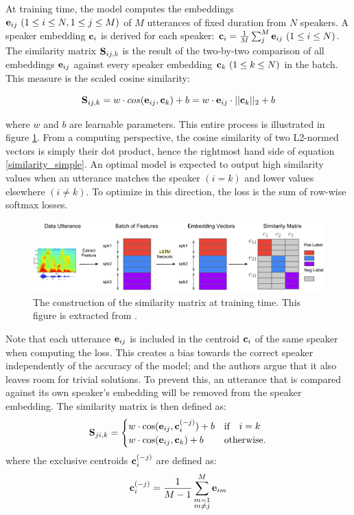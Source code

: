 \documentclass[a4paper, oneside, 12pt, english]{article}
\begin{document}
At training time, the model computes the embeddings $\mathbf{e}_{ij}\ (1 \leq i \leq N, 1 \leq j \leq M)$ of $M$ utterances of fixed duration from $N$ speakers. A speaker embedding $\mathbf{c}_i$ is derived for each speaker: $\mathbf{c}_i=\frac{1}{M}\sum_{j}^{M}\mathbf{e}_{ij}\ (1 \leq i \leq N)$. The similarity matrix $\mathbf{S}_{ij,k}$ is the result of the two-by-two comparison of all embeddings $\mathbf{e}_{ij}$ against every speaker embedding $\mathbf{c}_{k}\ (1 \leq k \leq N)$ in the batch. This measure is the scaled cosine similarity:

\begin{equation} \label{similarity_simple}
	\mathbf{S}_{ij,k} = w \cdot cos(\mathbf{e}_{ij}, \mathbf{c}_{k}) + b = w \cdot \mathbf{e}_{ij} \cdot ||\mathbf{c}_{k}||_2 + b
\end{equation}

where $w$ and $b$ are learnable parameters. This entire process is illustrated in figure \ref{sim_matrix}.  From a computing perspective, the cosine similarity of two L2-normed vectors is simply their dot product, hence the rightmost hand side of equation \ref{similarity_simple}. An optimal model is expected to output high similarity values when an utterance matches the speaker $(i = k)$ and lower values elsewhere $(i \neq k)$. To optimize in this direction, the loss is the sum of row-wise softmax losses.

\begin{figure}[h]
	\centering
	\includegraphics[width=\linewidth]{images/sim_matrix.png}
	\caption{The construction of the similarity matrix at training time. This figure is extracted from \citep{GE2E}.}
	\label{sim_matrix}
\end{figure}

Note that each utterance $\mathbf{e}_{ij}$ is included in the centroid $\mathbf{c}_{i}$ of the same speaker when computing the loss. This creates a bias towards the correct speaker independently of the accuracy of the model; and the authors argue that it also leaves room for trivial solutions. To prevent this, an utterance that is compared against its own speaker's embedding will be removed from the speaker embedding. The similarity matrix is then defined as:
\begin{equation} \label{similarity_exclusive}
\mathbf{S}_{ji,k} =
\begin{cases}
w\cdot \cos(\mathbf{e}_{ij}, \mathbf{c}_i^{(-j)})+b & \text{if} \quad i=k \\
w\cdot \cos(\mathbf{e}_{ij}, \mathbf{c}_k)+b & \text{otherwise}.
\end{cases}
\end{equation}
where the exclusive centroids $\mathbf{c}_{i}^{(-j)}$ are defined as:
\begin{equation} \label{exclusive_centroid}
\mathbf{c}_{i}^{(-j)} = \frac{1}{M-1}\sum_{\substack{m=1\\m\neq j}}^{M}\mathbf{e}_{im}
\end{equation}
\end{document}
